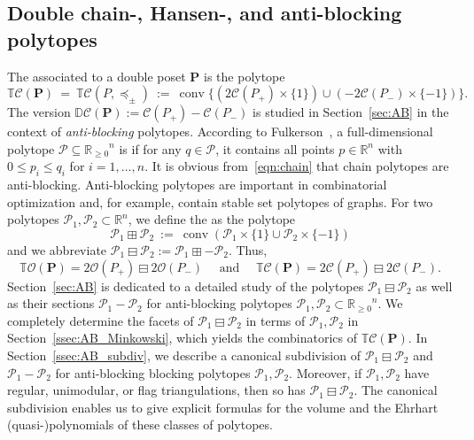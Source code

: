 \documentclass[11pt]{amsart}
\theoremstyle{definition}
\begin{document}
\subsection{Double chain-, Hansen-, and anti-blocking polytopes}
The {\textbf{\color{black}{double chain polytope}}} associated to a double poset ${\mathbf{P}}$ is the
polytope
\[
    {{\mathbb{T}}{\mathcal{C}({{{\mathbf{P}}}})}} \ = \ {{\mathbb{T}}{\mathcal{C}({{{{P},\preceq_\pm}}})}} \ := \ \operatorname{conv} \bigl\{
    (2{\mathcal{C}({{{P}_+}})} \times \{1\} ) \cup (-2{\mathcal{C}({{{P}_-}})} \times \{-1\} ) \bigr\}.
\]
The {\textbf{\color{black}{reduced}}} version ${\mathbb{D}{\mathcal{C}({{{\mathbf{P}}}})}} := {\mathcal{C}({{{P}_+}})} - {\mathcal{C}({{{P}_-}})}$
is studied in Section~\ref{sec:AB} in the context of \emph{anti-blocking}
polytopes. According to Fulkerson~\cite{Fulkerson}, a full-dimensional
polytope ${\mathcal{P}} \subseteq {{\mathbb{R}}_{\ge0}}^n$ is {\textbf{\color{black}{anti-blocking}}} if for any $q \in
{\mathcal{P}}$, it contains all points $p \in {\mathbb{R}}^n$ with $0 \le p_i \le q_i$ for
$i=1,\dots,n$.  It is obvious from~\eqref{eqn:chain} that chain polytopes are
anti-blocking. Anti-blocking polytopes are important in combinatorial
optimization and, for example, contain stable set polytopes of graphs.  For
two polytopes ${\mathcal{P}}_1,{\mathcal{P}}_2 \subset {\mathbb{R}}^n$, we define the {\textbf{\color{black}{Cayley sum}}} as
the polytope
\[
    {{{{\mathcal{P}}_1} \boxplus {{\mathcal{P}}_2}}} \ := \ \operatorname{conv}( {\mathcal{P}}_1 \times \{1\} \cup {\mathcal{P}}_2 \times
    \{-1\} )
\]
and we abbreviate ${{{{\mathcal{P}}_1} \boxminus {{\mathcal{P}}_2}}} := {{{{\mathcal{P}}_1} \boxplus {-{\mathcal{P}}_2}}}$. Thus,
\[
    {{\mathbb{T}}{\mathcal{O}({\mathbf{P}})}} = {{{2{\mathcal{O}({{P}_+})}} \boxminus {2{\mathcal{O}({{P}_-})}}}} \quad \text{ and } \quad
    {{\mathbb{T}}{\mathcal{C}({{{\mathbf{P}}}})}} = {{{2{\mathcal{C}({{{P}_+}})}} \boxminus {2{\mathcal{C}({{{P}_-}})}}}}. 
\]    
Section~\ref{sec:AB} is dedicated to a detailed study of the polytopes
${{{{\mathcal{P}}_1} \boxminus {{\mathcal{P}}_2}}}$ as well as their sections ${\mathcal{P}}_1 - {\mathcal{P}}_2$ for
anti-blocking polytopes ${\mathcal{P}}_1,{\mathcal{P}}_2 \subset {{\mathbb{R}}_{\ge0}}^n$. We completely determine
the facets of ${{{{\mathcal{P}}_1} \boxminus {{\mathcal{P}}_2}}}$ in terms of ${\mathcal{P}}_1,{\mathcal{P}}_2$ in
Section~\ref{ssec:AB_Minkowski}, which yields the combinatorics of
${{\mathbb{T}}{\mathcal{C}({{{\mathbf{P}}}})}}$.  In Section~\ref{ssec:AB_subdiv}, we describe a canonical
subdivision of ${{{{\mathcal{P}}_1} \boxminus {{\mathcal{P}}_2}}}$ and ${\mathcal{P}}_1 - {\mathcal{P}}_2$ for anti-blocking
blocking polytopes ${\mathcal{P}}_1,{\mathcal{P}}_2$. Moreover, if ${\mathcal{P}}_1,{\mathcal{P}}_2$ have regular,
unimodular, or flag triangulations, then so has ${{{{\mathcal{P}}_1} \boxminus {{\mathcal{P}}_2}}}$. The
canonical subdivision enables us to give explicit formulas for the volume and
the Ehrhart (quasi-)polynomials of these classes of polytopes.
\end{document}

